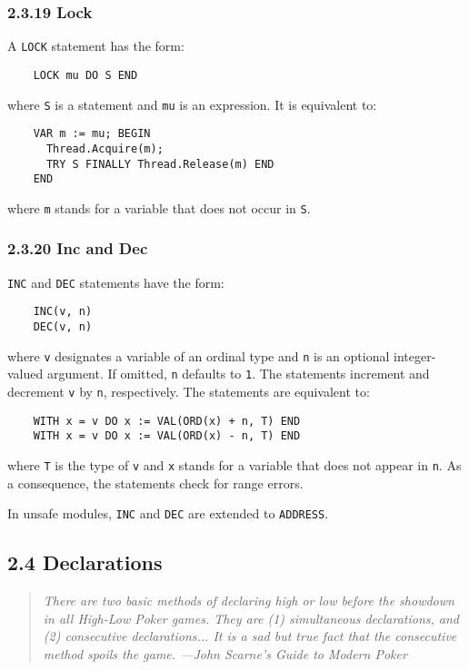 \documentclass[10pt]{article}
\begin{document}
\subsubsection*{2.3.19 Lock}

A \verb|LOCK| statement has the form:
\begin{verbatim}
    LOCK mu DO S END
\end{verbatim}
where \verb|S| is a statement and \verb|mu| is an expression.  It is
equivalent to:
\begin{verbatim}
    VAR m := mu; BEGIN
      Thread.Acquire(m);
      TRY S FINALLY Thread.Release(m) END
    END
\end{verbatim}
where \verb|m| stands for a variable that does not occur in \verb|S|.

\subsubsection*{2.3.20 Inc and Dec}

\verb|INC| and \verb|DEC| statements have the form:
\begin{verbatim}
    INC(v, n)
    DEC(v, n)
\end{verbatim}
where \verb|v| designates a variable of an ordinal type and \verb|n| is an
optional integer-valued argument.  If omitted, \verb|n| defaults to \verb|1|.
The statements increment and decrement \verb|v| by \verb|n|, respectively.
The statements are equivalent to:
\begin{verbatim}
    WITH x = v DO x := VAL(ORD(x) + n, T) END
    WITH x = v DO x := VAL(ORD(x) - n, T) END
\end{verbatim}
where \verb|T| is the type of \verb|v| and \verb|x| stands for a variable that
does not appear in \verb|n|.  As a consequence, the statements check for range
errors.

In unsafe modules, \verb|INC| and \verb|DEC| are extended to \verb|ADDRESS|.

\subsection*{2.4 Declarations}

\begin{quote}
  \emph{There are two basic methods of declaring high or low before the
    showdown in all High-Low Poker games.  They are (1) simultaneous
    declarations, and (2) consecutive declarations... It is a sad but true
    fact that the consecutive method spoils the game.  ---John Scarne's Guide
    to Modern Poker}
\end{quote}
\end{document}
